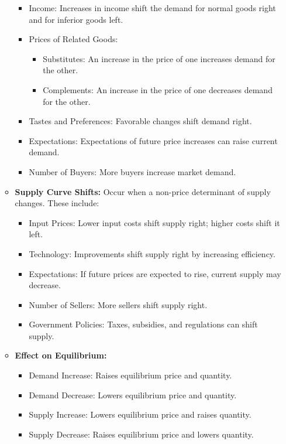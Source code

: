 \documentclass[
]{book}
\providecommand{\tightlist}{%
  \setlength{\itemsep}{0pt}\setlength{\parskip}{0pt}}
\begin{document}
\begin{enumerate}
\begin{itemize}
    \begin{itemize}
    \tightlist
    \item
      Income: Increases in income shift the demand for normal goods right and for inferior goods left.
    \item
      Prices of Related Goods:

      \begin{itemize}
      \tightlist
      \item
        Substitutes: An increase in the price of one increases demand for the other.
      \item
        Complements: An increase in the price of one decreases demand for the other.
      \end{itemize}
    \item
      Tastes and Preferences: Favorable changes shift demand right.
    \item
      Expectations: Expectations of future price increases can raise current demand.
    \item
      Number of Buyers: More buyers increase market demand.
    \end{itemize}
  \item
    \textbf{Supply Curve Shifts:} Occur when a non-price determinant of supply changes. These include:

    \begin{itemize}
    \tightlist
    \item
      Input Prices: Lower input costs shift supply right; higher costs shift it left.
    \item
      Technology: Improvements shift supply right by increasing efficiency.
    \item
      Expectations: If future prices are expected to rise, current supply may decrease.
    \item
      Number of Sellers: More sellers shift supply right.
    \item
      Government Policies: Taxes, subsidies, and regulations can shift supply.
    \end{itemize}
  \item
    \textbf{Effect on Equilibrium:}

    \begin{itemize}
    \tightlist
    \item
      Demand Increase: Raises equilibrium price and quantity.
    \item
      Demand Decrease: Lowers equilibrium price and quantity.
    \item
      Supply Increase: Lowers equilibrium price and raises quantity.
    \item
      Supply Decrease: Raises equilibrium price and lowers quantity.
    \end{itemize}
  \end{itemize}
\end{enumerate}
\end{document}
